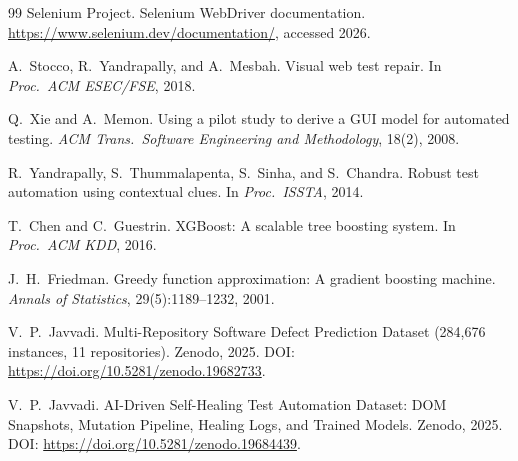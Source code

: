 \documentclass[conference]{IEEEtran}
\begin{document}
\begin{thebibliography}{99}
 {Selenium Project}. Selenium {WebDriver} documentation. \url{https://www.selenium.dev/documentation/}, accessed 2026.

 A.~Stocco, R.~Yandrapally, and A.~Mesbah. Visual web test repair. In \emph{Proc.\ ACM ESEC/FSE}, 2018.

 Q.~Xie and A.~Memon. Using a pilot study to derive a {GUI} model for automated testing. \emph{ACM Trans.\ Software Engineering and Methodology}, 18(2), 2008.

 R.~Yandrapally, S.~Thummalapenta, S.~Sinha, and S.~Chandra. Robust test automation using contextual clues. In \emph{Proc.\ ISSTA}, 2014.

 T.~Chen and C.~Guestrin. {XGBoost}: A scalable tree boosting system. In \emph{Proc.\ ACM KDD}, 2016.

 J.~H.~Friedman. Greedy function approximation: A gradient boosting machine. \emph{Annals of Statistics}, 29(5):1189--1232, 2001.

 V.~P.~Javvadi. Multi-Repository Software Defect Prediction Dataset (284,676 instances, 11 repositories). Zenodo, 2025. DOI: \url{https://doi.org/10.5281/zenodo.19682733}.

 V.~P.~Javvadi. AI-Driven Self-Healing Test Automation Dataset: DOM Snapshots, Mutation Pipeline, Healing Logs, and Trained Models. Zenodo, 2025. DOI: \url{https://doi.org/10.5281/zenodo.19684439}.

\end{thebibliography}
\end{document}
